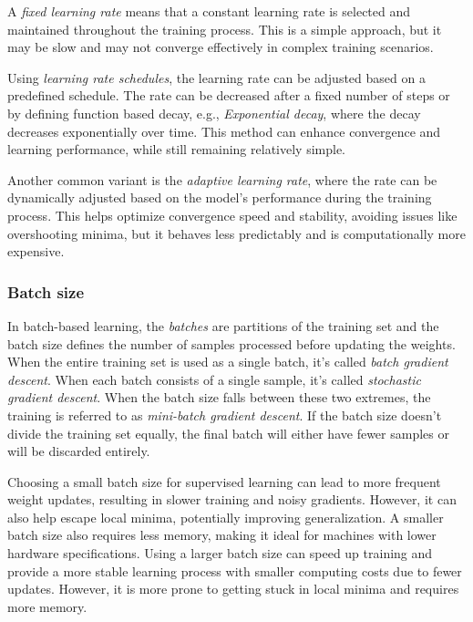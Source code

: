 \documentclass[a4paper,oneside,onecolumn,12pt]{book}
\begin{document}
		A \textit{fixed learning rate} means that a constant learning rate is selected and maintained throughout the training process. This is a simple approach, but it may be slow and may not converge effectively in complex training scenarios.

		Using \textit{learning rate schedules}, the learning rate can be adjusted based on a predefined schedule. The rate can be decreased after a fixed number of steps or by defining function based decay, e.g., \textit{Exponential decay}, where the decay decreases exponentially over time. This method can enhance convergence and learning performance, while still remaining relatively simple. 

		Another common variant is the \textit{adaptive learning rate}, where the rate can be dynamically adjusted based on the model's performance during the training process. This helps optimize convergence speed and stability, avoiding issues like overshooting minima, but it behaves less predictably and is computationally more expensive. \cite{LRSALRMDL}

		\subsubsection{Batch size}
		In batch-based learning, the \textit{batches} are partitions of the training set and the batch size defines the number of samples processed before updating the weights. When the entire training set is used as a single batch, it's called \textit{batch gradient descent}. When each batch consists of a single sample, it's called \textit{stochastic gradient descent}. When the batch size falls between these two extremes, the training is referred to as \textit{mini-batch gradient descent}. If the batch size doesn't divide the training set equally, the final batch will either have fewer samples or will be discarded entirely. \cite{DBBENN} 

		Choosing a small batch size for supervised learning can lead to more frequent weight updates, resulting in slower training and noisy gradients. However, it can also help escape local minima, potentially improving generalization. A smaller batch size also requires less memory, making it ideal for machines with lower hardware specifications. Using a larger batch size can speed up training and provide a more stable learning process with smaller computing costs due to fewer updates. However, it is more prone to getting stuck in local minima and requires more memory. \cite{HDBSIYML}
\end{document}
